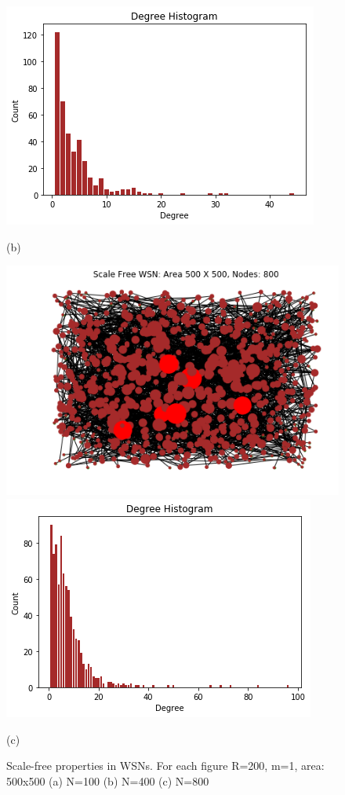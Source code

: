 \documentclass{article}
\begin{document}
\begin{figure}[!htb]
		\includegraphics[width=\linewidth]{Results/400-1(B).png}
		\begin{center}
			(b)
		\end{center}
		\endminipage\hfill
		\includegraphics[width=\linewidth]{Results/800-1.png}
		\includegraphics[width=\linewidth]{Results/800-1(B).png}
		\begin{center}
			(c)
		\end{center}
		\endminipage
		\caption{Scale-free properties in WSNs. For each figure R=200, m=1, area: 500x500 (a) N=100 (b) N=400 (c) N=800}
	\end{figure}
	
\end{document}
